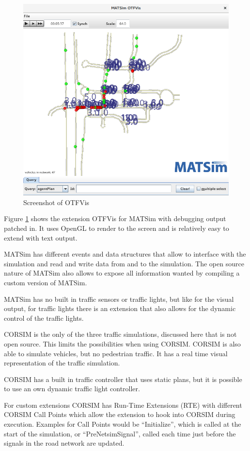 \begin{figure}[!ht]
  \centering
  \includegraphics[width=12cm]{figures/otfvis}
  \caption{Screenshot of OTFVis}
  \label{otfvis}
\end{figure}

Figure \ref{otfvis} shows the extension OTFVis for MATSim with debugging output patched in. It uses OpenGL to render to the screen and is relatively easy to extend with text output.

MATSim has different events and data structures that allow to interface with the simulation and read and write data from and to the simulation. The open source nature of MATSim also allows to expose all information wanted by compiling a custom version of MATSim.

MATSim has no built in traffic sensors or traffic lights, but like for the visual output, for traffic lights there is an extension that also allows for the dynamic control of the traffic lights.

CORSIM is the only of the three traffic simulations, discussed here that is not open source.\cite{corSim} This limits the possibilities when using CORSIM. CORSIM is also able to simulate vehicles, but no pedestrian traffic. It has a real time visual representation of the traffic simulation.

CORSIM has a built in traffic controller that uses static plans, but it is possible to use an own dynamic traffic light controller.

For custom extensions CORSIM has Run-Time Extensions (RTE) with different CORSIM Call Points which allow the extension to hook into CORSIM during execution. Examples for Call Points would be ``Initialize'', which is called at the start of the simulation, or ``PreNetsimSignal'', called each time just before the signals in the road network are updated.\cite{corSimRte}

